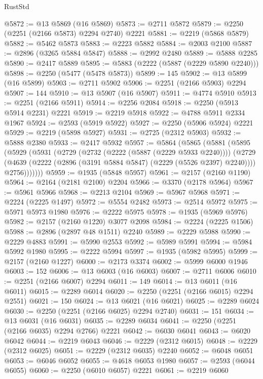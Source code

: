 \begin{lexlean}{RustStd}
\begin{coremodule}
@5872 := @13 @5869 (@16 @5869)
@5873 := @2711 @5872
@5879 := @2250 (@2251 (@2166 @5873) @2294 @2740) @2221
@5881 := @2219 (@5868 @5879)
@5882 := @5462 @5873
@5883 := @2223 @5882
@5884 := @2003 @2100
@5887 := @2896 (@3265 @5884 @5847)
@5888 := @2992 @2480
@5889 := @5888 @2285
@5890 := @2417 @5889
@5895 := @5883 (@2222 (@5887 (@2229 @5890 @2240)))
@5898 := @2250 (@5477 (@5478 @5873))
@5899 := 145
@5902 := @13 @5899 (@16 @5899)
@5903 := @2711 @5902
@5906 := @2251 (@2166 @5903) @2294
@5907 := 144
@5910 := @13 @5907 (@16 @5907)
@5911 := @4774 @5910
@5913 := @2251 (@2166 @5911)
@5914 := @2256 @2084
@5918 := @2250 (@5913 @5914 @2231) @2221
@5919 := @2219 @5918
@5922 := @4788 @5911 @2334 @1967
@5924 := @2593 (@5919 @5922)
@5927 := @2250 (@5906 @5924) @2221
@5929 := @2219 (@5898 @5927)
@5931 := @2725 (@2312 @5903)
@5932 := @5888 @2380
@5933 := @2417 @5932
@5957 := @5864
    (@5865
      (@5881
        (@5895
          (@5929
            (@5931
              (@2729
                (@2732 (@2222 (@5887 (@2229 @5933 @2240))))
                (@2729
                  (@4639 (@2222 (@2896 (@3191 @5884 @5847) (@2229 (@5526 @2397) @2240))))
                  @2756)))))))
@5959 := @1935 (@5848 @5957)
@5961 := @2157 (@2160 @1190)
@5964 := @2164 (@2181 @2100) @2204
@5966 := @3370 (@2178 @5964)
@5967 := @5961 @5966
@5968 := @2213 @2104
@5969 := @5967 @5968
@5971 := @2224 (@2225 @1497)
@5972 := @5554 @2482
@5973 := @2514 @5972
@5975 := @5971 @5973 @1980
@5976 := @2222 @5975
@5978 := @1935 (@5969 @5976)
@5982 := @2157 (@2160 @1220) @3077 @2098
@5984 := @2224 (@2225 @1506)
@5988 := @2896 (@2897 @48 @1511) @2240
@5989 := @2229 @5988
@5990 := @2229 @4883
@5991 := @5990 @2553
@5992 := @5989 @5991
@5994 := @5984 @5992 @1980
@5995 := @2222 @5994
@5997 := @1935 (@5982 @5995)
@5999 := @2157 (@2160 @1227)
@6000 := @2173 @3374
@6002 := @5999 @6000 @1946
@6003 := 152
@6006 := @13 @6003 (@16 @6003)
@6007 := @2711 @6006
@6010 := @2251 (@2166 @6007) @2294
@6011 := 149
@6014 := @13 @6011 (@16 @6011)
@6015 := @2289 @6014
@6020 := @2250 (@2251 (@2166 @6015) @2294 @2551)
@6021 := 150
@6024 := @13 @6021 (@16 @6021)
@6025 := @2289 @6024
@6030 := @2250 (@2251 (@2166 @6025) @2294 @2740)
@6031 := 151
@6034 := @13 @6031 (@16 @6031)
@6035 := @2289 @6034
@6041 := @2250 (@2251 (@2166 @6035) @2294 @2766) @2221
@6042 := @6030 @6041
@6043 := @6020 @6042
@6044 := @2219 @6043
@6046 := @2229 (@2312 @6015)
@6048 := @2229 (@2312 @6025)
@6051 := @2229 (@2312 @6035) @2240
@6052 := @6048 @6051
@6053 := @6046 @6052
@6055 := @4618 @6053 @1980
@6057 := @2593 (@6044 @6055)
@6060 := @2250 (@6010 @6057) @2221
@6061 := @2219 @6060

\end{coremodule}
\end{lexlean}
